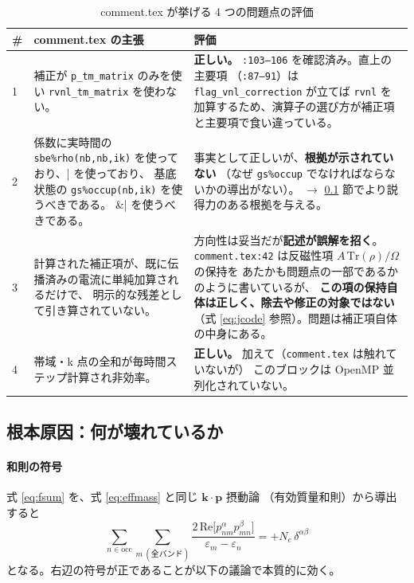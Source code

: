 \documentclass[dvipdfmx,a4paper,11pt]{jsarticle}
\newcommand{\file}[1]{\texttt{#1}}
\newcommand{\vk}{\bm{k}}
\newcommand{\vp}{\bm{p}}
\newcommand{\Tr}{\mathrm{Tr}}
\newcommand{\Real}{\mathrm{Re}}
\newcommand{\eps}{\varepsilon}
\begin{document}
\begin{table}[htbp]
\centering
\caption{comment.tex が挙げる 4 つの問題点の評価}
\label{tab:codex-issues}
\begin{tabular}{@{}p{8mm}p{58mm}p{78mm}@{}}
\toprule
\# & \textbf{comment.tex の主張} & \textbf{評価} \\
\midrule
1 &
補正が \file{p\_tm\_matrix} のみを使い \file{rvnl\_tm\_matrix} を使わない。 &
\textbf{正しい。} \file{:103--106} を確認済み。直上の主要項
（\file{:87--91}）は \file{flag\_vnl\_correction} が立てば \file{rvnl} を
加算するため、演算子の選び方が補正項と主要項で食い違っている。 \\[2mm]

2 &
係数に実時間の \verb|sbe%rho(nb,nb,ik)| を使っており、
基底状態の \verb|gs%occup(nb,ik)| を使うべきである。 &
事実として正しいが、\textbf{根拠が示されていない}
（なぜ \file{gs\%occup} でなければならないかの導出がない）。
$\rightarrow$ \ref{sec:codex-deriv} 節でより説得力のある根拠を与える。 \\[2mm]

3 &
計算された補正項が、既に伝播済みの電流に単純加算されるだけで、
明示的な残差として引き算されていない。 &
方向性は妥当だが\textbf{記述が誤解を招く}。
\file{comment.tex:42} は反磁性項 $A\,\Tr(\rho)/\Omega$ の保持を
あたかも問題点の一部であるかのように書いているが、
\textbf{この項の保持自体は正しく、除去や修正の対象ではない}
（式 \eqref{eq:jcode} 参照）。問題は補正項自体の中身にある。 \\[2mm]

4 &
帯域・k 点の全和が毎時間ステップ計算され非効率。 &
\textbf{正しい。} 加えて（\file{comment.tex} は触れていないが）
このブロックは OpenMP 並列化されていない。 \\
\bottomrule
\end{tabular}
\end{table}

\subsection{根本原因：何が壊れているか}
\label{sec:codex-deriv}

\paragraph{和則の符号}
式 \eqref{eq:fsum} を、式 \eqref{eq:effmass} と同じ $\vk\cdot\vp$ 摂動論
（有効質量和則）から導出すると
%
\begin{equation}
  \sum_{n \in \mathrm{occ}} \sum_{m\ (\text{全バンド})}
  \frac{2\,\Real\bigl[p^\alpha_{nm} p^\beta_{mn}\bigr]}{\eps_m - \eps_n}
  = +N_e\,\delta^{\alpha\beta}
  \label{eq:fsum-corrected}
\end{equation}
%
となる。右辺の符号が正であることが以下の議論で本質的に効く。
\end{document}
